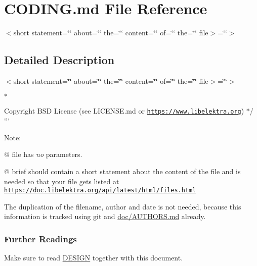 \hypertarget{CODING_8md}{}\section{C\+O\+D\+I\+N\+G.\+md File Reference}
\label{CODING_8md}


$<$short statement=\char`\"{}\char`\"{} about=\char`\"{}\char`\"{} the=\char`\"{}\char`\"{} content=\char`\"{}\char`\"{} of=\char`\"{}\char`\"{} the=\char`\"{}\char`\"{} file$>$=\char`\"{}\char`\"{}$>$
\begin{DoxyItemize}
\item 
\end{DoxyItemize} 




\subsection{Detailed Description}
$<$short statement=\char`\"{}\char`\"{} about=\char`\"{}\char`\"{} the=\char`\"{}\char`\"{} content=\char`\"{}\char`\"{} of=\char`\"{}\char`\"{} the=\char`\"{}\char`\"{} file$>$=\char`\"{}\char`\"{}$>$
\begin{DoxyItemize}
\item 
\end{DoxyItemize}


\begin{DoxyItemize}
\item 
\item $\ast$ \begin{DoxyCopyright}{Copyright}
B\+SD License (see L\+I\+C\+E\+N\+S\+E.\+md or \href{https://www.libelektra.org}{\tt https\+://www.\+libelektra.\+org}) $\ast$/ ```
\end{DoxyCopyright}
Note\+:
\end{DoxyItemize}

{\ttfamily @} {\ttfamily file} has {\itshape no} parameters.
\begin{DoxyItemize}
\item {\ttfamily @} {\ttfamily brief} should contain a short statement about the content of the file and is needed so that your file gets listed at \href{https://doc.libelektra.org/api/latest/html/files.html}{\tt https\+://doc.\+libelektra.\+org/api/latest/html/files.\+html}
\end{DoxyItemize}

The duplication of the filename, author and date is not needed, because this information is tracked using git and \hyperlink{doc_AUTHORS_md}{doc/\+A\+U\+T\+H\+O\+RS.md} already.

\subsubsection*{Further Readings}


\begin{DoxyItemize}
\item Make sure to read \hyperlink{doc_DESIGN_md}{D\+E\+S\+I\+GN} together with this document. 
\end{DoxyItemize}